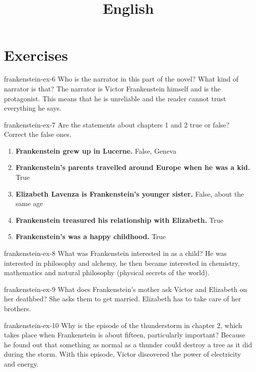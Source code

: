 \documentclass[preview]{standalone}
\begin{document}
\title{English}
\genpage

\section{Exercises}

\begin{snippetexercise}{frankenstein-ex-6}
    {Who is the narrator in this part of the novel? What kind of narrator is that?}
    The narrator is Victor Frankenstein himself and is the protagonist.
    This means that he is unreliable and the reader cannot trust everything he says.
\end{snippetexercise}

\begin{snippetexercise}{frankenstein-ex-7}
    {Are the statements about chapters 1 and 2 true or false? Correct the false ones.}
    \begin{enumerate}
        \item \textbf{Frankenstein grew up in Lucerne.} False, Geneva
        \item \textbf{Frankenstein's parents travelled around Europe when he was a kid.} True
        \item \textbf{Elizabeth Lavenza is Frankenstein's younger sister.} False, about the same age
        \item \textbf{Frankenstein treasured his relationship with Elizabeth.} True
        \item \textbf{Frankenstein's was a happy childhood.} True
    \end{enumerate}
\end{snippetexercise}

\begin{snippetexercise}{frankenstein-ex-8}
    {What was Frankenstein interested in as a child?}
    He was interested in philosophy and alchemy, he then became interested in
    chemistry, mathematics and natural philosophy (physical secrets of the world).
\end{snippetexercise}

\begin{snippetexercise}{frankenstein-ex-9}
    {What does Frankenstein's mother ask Victor and Elizabeth on her deathbed?}
    She asks them to get married. Elizabeth has to take care of her brothers.
\end{snippetexercise}

\begin{snippetexercise}{frankenstein-ex-10}
    {Why is the episode of the thunderstorm in chapter 2, which takes place when Frankenstein is
    about fifteen, particularly important?}
    Because he found out that something as normal as a thunder could
    destroy a tree as it did  during the storm.
    With this episode, Victor discovered the power of electricity and energy.
\end{snippetexercise}
\end{document}
